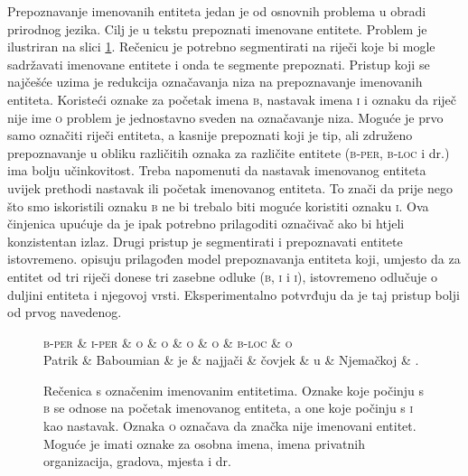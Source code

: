 Prepoznavanje imenovanih entiteta  jedan je od
osnovnih problema u obradi prirodnog jezika. Cilj je u tekstu prepoznati
imenovane entitete. Problem je ilustriran na slici
\ref{fig:namedentityrecognition}. Rečenicu je potrebno segmentirati na riječi
koje bi mogle sadržavati imenovane entitete i onda te segmente prepoznati.
Pristup koji se najčešće uzima je redukcija označavanja niza na prepoznavanje
imenovanih entiteta. Koristeći oznake za početak imena \textsc{b}, nastavak
imena \textsc{i} i oznaku da riječ nije ime \textsc{o} problem je jednostavno
sveden na označavanje niza. Moguće je prvo samo označiti riječi entiteta, a
kasnije prepoznati koji je tip, ali združeno prepoznavanje u obliku različitih
oznaka za različite entitete (\textsc{b-per}, \textsc{b-loc} i dr.) ima bolju
učinkovitost. Treba napomenuti da nastavak imenovanog entiteta uvijek prethodi
nastavak ili početak imenovanog entiteta. To znači da prije nego što smo
iskoristili oznaku \textsc{b} ne bi trebalo biti moguće koristiti oznaku
\textsc{i}. Ova činjenica upućuje da je ipak potrebno prilagoditi označivač ako
bi htjeli konzistentan izlaz. Drugi pristup je segmentirati i prepoznavati
entitete istovremeno. \citet{sarawagi2004semi} opisuju prilagođen model
prepoznavanja entiteta koji, umjesto da za entitet od tri riječi donese tri
zasebne odluke (\textsc{b}, \textsc{i} i \textsc{i}), istovremeno odlučuje o
duljini entiteta i njegovoj vrsti. Eksperimentalno potvrđuju da je taj pristup
bolji od prvog navedenog.

\begin{figure}[H]
\centering
\begin{dependency}
\begin{deptext}
  \textsc{b-per} \& \textsc{i-per} \& \textsc{o} \& \textsc{o} \& \textsc{o} \& \textsc{o} \& \textsc{b-loc} \& \textsc{o} \\
  Patrik         \& Baboumian      \& je         \& najjači    \& čovjek     \& u          \& Njemačkoj      \& .          \\
\end{deptext}
\end{dependency}
\caption[Rečenica s označenim imenovanim entitetima.]{Rečenica s označenim
imenovanim entitetima. Oznake koje počinju s \textsc{b} se odnose na početak
imenovanog entiteta, a one koje počinju s \textsc{i} kao nastavak. Oznaka
\textsc{o} označava da značka nije imenovani entitet. Moguće je imati oznake za
osobna imena, imena privatnih organizacija, gradova, mjesta i dr.}
\label{fig:namedentityrecognition}
\end{figure}


